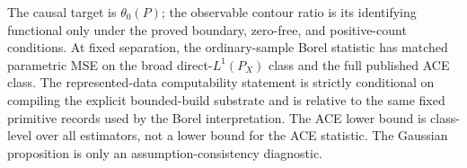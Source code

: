 The causal target is \(\theta_0(P)\); the observable contour ratio is its identifying functional only under the proved boundary, zero-free, and positive-count conditions. At fixed separation, the ordinary-sample Borel statistic has matched parametric MSE on the broad direct-\(L^1(P_X)\) class and the full published ACE class. The represented-data computability statement is strictly conditional on compiling the explicit bounded-build substrate and is relative to the same fixed primitive records used by the Borel interpretation. The ACE lower bound is class-level over all estimators, not a lower bound for the ACE statistic. The Gaussian proposition is only an assumption-consistency diagnostic.
